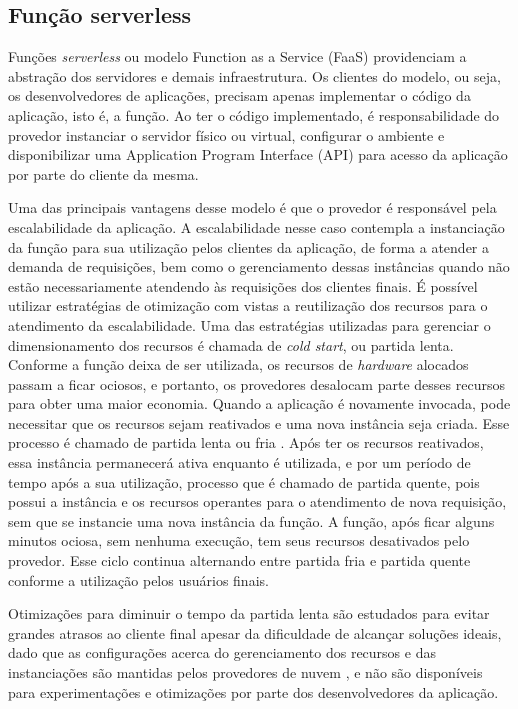 \documentclass[conference]{IEEEtran}
\begin{document}
\subsection{Função serverless}
\label{subsec:serverless_funcion}

Funções \textit{serverless} ou modelo Function as a Service (FaaS) providenciam a abstração dos servidores e demais infraestrutura. Os clientes do modelo, ou seja, os desenvolvedores de aplicações, precisam apenas implementar o código da aplicação, isto é, a função. Ao ter o código implementado, é responsabilidade do provedor instanciar o servidor físico ou virtual, configurar o ambiente e disponibilizar uma Application Program Interface (API) para acesso da aplicação por parte do cliente da mesma. 

Uma das principais vantagens desse modelo é que o provedor é responsável pela escalabilidade da aplicação. A escalabilidade nesse caso contempla a instanciação da função para sua utilização pelos clientes da aplicação, de forma a atender a demanda de requisições, bem como o gerenciamento dessas instâncias quando não estão necessariamente atendendo às requisições dos clientes finais. É possível utilizar estratégias de otimização com vistas a reutilização dos recursos para o atendimento da escalabilidade.
Uma das estratégias utilizadas para gerenciar o dimensionamento dos recursos é chamada de \textit{cold start}, ou partida lenta. 
Conforme a função deixa de ser utilizada, os recursos de \textit{hardware} alocados passam a ficar ociosos, e portanto, os provedores desalocam parte desses recursos para obter uma maior economia. Quando a aplicação é novamente invocada, pode necessitar que os recursos sejam reativados e uma nova instância seja criada. Esse processo é chamado de partida lenta ou fria \cite{vahidinia_2020_cold_start}. Após ter os recursos reativados, essa instância permanecerá ativa enquanto é utilizada, e por um período de tempo após a sua utilização, processo que é chamado de partida quente, pois possui a instância e os recursos operantes \cite{Raje_2023_cold_warm_start} para o atendimento de nova requisição, sem que se instancie uma nova instância da função. A função, após ficar alguns minutos ociosa, sem nenhuma execução, tem seus recursos desativados pelo provedor. Esse ciclo continua alternando entre partida fria e partida quente conforme a utilização pelos usuários finais.

Otimizações para diminuir o tempo da partida lenta são estudados para evitar grandes atrasos ao cliente final apesar da dificuldade de alcançar soluções ideais, dado que as configurações acerca do gerenciamento dos recursos e das instanciações são mantidas pelos provedores de nuvem \cite{vahidinia_2020_cold_start, kumari_2022_mitigating_cold_start, vahidinia_2023_mitigating_cold_start, dantas_2022_reducing_cold_start}, e não são disponíveis para experimentações e otimizações por parte dos desenvolvedores da aplicação.
\end{document}
